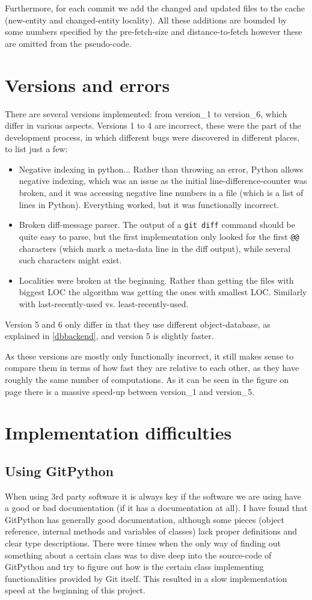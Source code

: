 \documentclass[12pt,twoside,notitlepage]{report}
\begin{document}
Furthermore, for each commit we add the changed and updated files to the cache (new-entity and changed-entity locality). All these additions are bounded by some numbers specified by the pre-fetch-size and distance-to-fetch however these are omitted from the pseudo-code.
\section{Versions and errors}
There are several versions implemented: from version\_1 to version\_6, which differ in various aspects. Versions 1 to 4 are incorrect, these were the part of the development process, in which different bugs were discovered in different places, to list just a few:
\begin{itemize}
\item Negative indexing in python... Rather than throwing an error, Python allows negative indexing, which was an issue as the initial line-difference-counter was broken, and it was accessing negative line numbers in a file (which is a list of lines in Python). Everything worked, but it was functionally incorrect.
\item Broken diff-message parser. The output of a \texttt{git diff} command should be quite easy to parse, but the first implementation only looked for the first \texttt{@@} characters (which mark a meta-data line in the diff output), while several such characters might exist.
\item Localities were broken at the beginning. Rather than getting the files with biggest LOC the algorithm was getting the ones with smallest LOC. Similarly with last-recently-used vs. least-recently-used.
\end{itemize}
Version 5 and 6 only differ in that they use different object-database, as explained in \ref{dbbackend}, and version 5 is slightly faster.

As these versions are mostly only functionally incorrect, it still makes sense to compare them in terms of how fast they are relative to each other, as they have roughly the same number of computations. As it can be seen in the figure on page \pageref{fig:speedup} there is a massive speed-up between version\_1 and version\_5.
\section{Implementation difficulties}
\subsection{Using GitPython}
When using 3rd party software it is always key if the software we are using have a good or bad documentation (if it has a documentation at all). I have found that GitPython has generally good documentation, although some pieces (object reference, internal methods and variables of classes) lack proper definitions and clear type descriptions. There were times when the only way of finding out something about a certain class was to dive deep into the source-code of GitPython and try to figure out how is the certain class implementing functionalities provided by Git itself. This resulted in a slow implementation speed at the beginning of this project.
\end{document}
